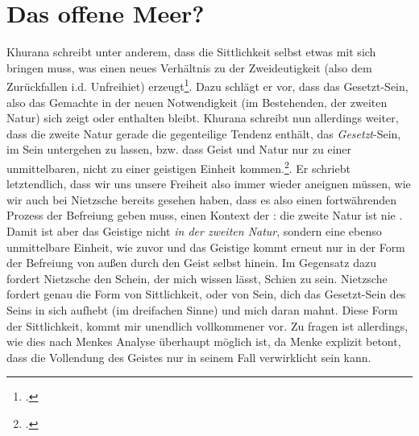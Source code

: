 \documentclass[12pt, a4paper, openany]{report}
\begin{document}
\section{Das offene Meer?}\label{abschnitt_4}
Khurana schreibt unter anderem, dass die Sittlichkeit selbst etwas mit sich bringen muss, was einen neues Verhältnis zu der Zweideutigkeit (also dem Zurückfallen i.d. Unfreihiet) erzeugt\footcite[Vgl.][399]{khurana_freiheit_2017}.
Dazu schlägt er vor, dass das Gesetzt-Sein, also das Gemachte in der neuen Notwendigkeit (im Bestehenden, der zweiten Natur) sich zeigt oder enthalten bleibt. 
Khurana schreibt nun allerdings weiter, dass die zweite Natur gerade die gegenteilige Tendenz enthält, das \emph{Gesetzt}-Sein, im Sein untergehen zu lassen, bzw. dass Geist und Natur nur zu einer unmittelbaren, nicht zu einer geistigen Einheit kommen.\footcite[Vgl.][401]{khurana_freiheit_2017}.
Er schriebt letztendlich, dass wir uns unsere Freiheit also immer wieder aneignen müssen, wie wir auch bei Nietzsche bereits gesehen haben, dass es also einen fortwährenden Prozess der Befreiung geben muss, einen Kontext der : 
die zweite Natur ist nie .
Damit ist aber das Geistige nicht \emph{in der zweiten Natur}, sondern eine ebenso unmittelbare Einheit, wie zuvor und das Geistige kommt erneut nur in der Form der Befreiung von außen durch den Geist selbst hinein. 
Im Gegensatz dazu fordert Nietzsche den Schein, der mich wissen lässt, Schien zu sein.
Nietzsche fordert genau die Form von Sittlichkeit, oder von Sein, dich das Gesetzt-Sein des Seins in sich aufhebt (im dreifachen Sinne) und mich daran mahnt. 
Diese Form der Sittlichkeit, kommt mir unendlich vollkommener vor.
Zu fragen ist allerdings, wie dies nach Menkes Analyse überhaupt möglich ist, da Menke explizit betont, dass die Vollendung des Geistes nur in seinem Fall verwirklicht sein kann.\\
\end{document}
